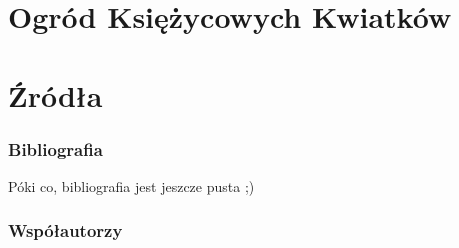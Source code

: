 \documentclass[]{coda-art}
\begin{document}





\clearpage\thispagestyle{akt}

\part{Ogród Księżycowych Kwiatków}
\label{akt:ogrod}






\clearpage\thispagestyle{akt}

\part{Źródła}
\label{akt:zrodla}






\clearpage\pagestyle{plain}

{}

\section*{Bibliografia}
\label{zal:bibliografia}

\ornamentbreak

Póki co, bibliografia jest jeszcze pusta ;)



\clearpage\pagestyle{plain}

{}

\section*{Współautorzy}
\label{zal:wspolautorzy}

\ornamentbreak


\end{document}
